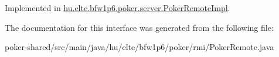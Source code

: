 Implemented in \hyperlink{classhu_1_1elte_1_1bfw1p6_1_1poker_1_1server_1_1_poker_remote_impl_ac049557195515bd6f63b156dead3527b}{hu.\+elte.\+bfw1p6.\+poker.\+server.\+Poker\+Remote\+Impl}.



The documentation for this interface was generated from the following file\+:\begin{DoxyCompactItemize}
\item 
poker-\/shared/src/main/java/hu/elte/bfw1p6/poker/rmi/Poker\+Remote.\+java\end{DoxyCompactItemize}
